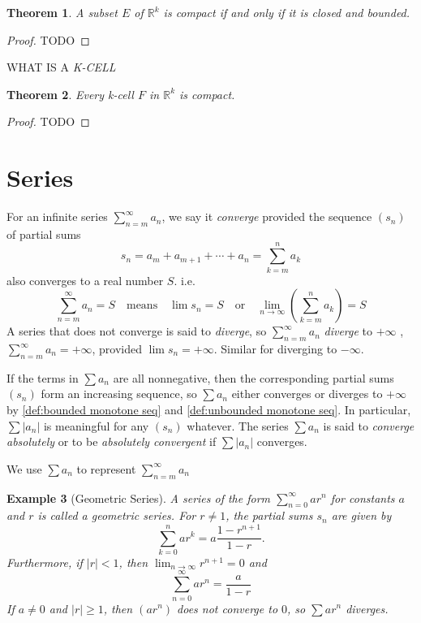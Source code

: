 \documentclass[12pt, lettersize]{book}
\newtheorem{thm}{Theorem}[section]
\newtheorem{eg}[thm]{Example}
\begin{document}
	\begin{thm}
		A subset $E$ of $\mathbb{R}^k$ is compact if and only if it is closed and bounded.
	\end{thm}
	\begin{proof}
		TODO
	\end{proof}
	
	WHAT IS A \emph{K-CELL}
	
	\begin{thm}
		Every k-cell $F$ in $\mathbb{R}^k$ is compact.
	\end{thm}
	\begin{proof}
		TODO
	\end{proof}
	\newpage
	\section{Series}
	For an infinite series $\sum_{n=m}^{\infty}a_n$, we say it \emph{converge} provided the sequence $(s_n)$ of 
	partial sums
	\begin{displaymath}
		s_n=a_m+a_{m+1}+\cdots+a_n=\sum_{k=m}^{n}a_k
	\end{displaymath}
	also converges to a real number $S$. i.e.
	\begin{displaymath}
		\sum_{n=m}^{\infty}a_n=S\quad\text{means}\quad\lim s_n=S\quad\text{or}\quad\lim\limits_{n\rightarrow\infty}\left(\sum_{k=m}^{n}a_k\right)=S
	\end{displaymath}
	A series that does not converge is said to \emph{diverge}, so $\sum_{n=m}^{\infty}a_n$ \emph{diverge} to $+\infty$
	, $\sum_{n=m}^{\infty}a_n=+\infty$, provided $\lim s_n=+\infty$. Similar for diverging to $-\infty$.
	
	If the terms in $\sum a_n$ are all nonnegative, then the corresponding partial sums $(s_n)$ form an increasing sequence, so $\sum a_n$ either converges or diverges to $+\infty$ by \ref{def:bounded monotone seq} and \ref{def:unbounded monotone seq}. In particular, $\sum |a_n|$ is meaningful for any $(s_n)$ whatever. The series
	$\sum a_n$ is said to \emph{converge absolutely} or to be \emph{absolutely convergent} if $\sum |a_n|$ converges.
	
	We use $\sum a_n$ to represent $\sum_{n=m}^{\infty}a_n$
	
	\begin{eg}[Geometric Series]
		A series of the form $\sum_{n=0}^{\infty}ar^n$ for constants $a$ and $r$ is called a geometric series. For $r\neq1$,
		the partial sums $s_n$ are given by
		\begin{displaymath}
			\sum_{k=0}^{n}ar^k=a\frac{1-r^{n+1}}{1-r}.
		\end{displaymath}
		Furthermore, if $|r|<1$, then $\lim_{n\rightarrow \infty}r^{n+1}=0$ and
		\begin{displaymath}
			\sum_{n=0}^{\infty}ar^n=\frac{a}{1-r}
		\end{displaymath}
		If $a\neq0$ and $|r|\geq1$, then $(ar^n)$ does not converge to $0$, so $\sum ar^n$ diverges.
	\end{eg}
	
\end{document}

